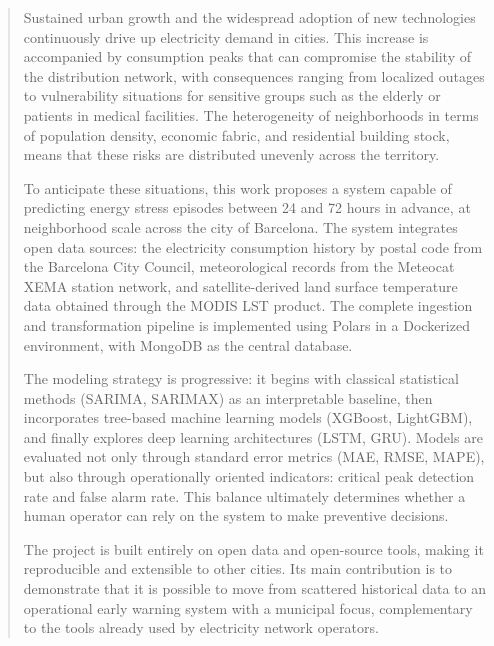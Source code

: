 \documentclass[12pt, a4paper]{article}
\begin{document}
\renewcommand{\abstractname}{Abstract}
\begin{abstract}
Sustained urban growth and the widespread adoption of new technologies continuously drive up electricity demand in cities. This increase is accompanied by consumption peaks that can compromise the stability of the distribution network, with consequences ranging from localized outages to vulnerability situations for sensitive groups such as the elderly or patients in medical facilities. The heterogeneity of neighborhoods in terms of population density, economic fabric, and residential building stock, means that these risks are distributed unevenly across the territory.

To anticipate these situations, this work proposes a system capable of predicting energy stress episodes between 24 and 72 hours in advance, at neighborhood scale across the city of Barcelona. The system integrates open data sources: the electricity consumption history by postal code from the Barcelona City Council, meteorological records from the Meteocat XEMA station network, and satellite-derived land surface temperature data obtained through the MODIS LST product. The complete ingestion and transformation pipeline is implemented using Polars in a Dockerized environment, with MongoDB as the central database.

The modeling strategy is progressive: it begins with classical statistical methods (SARIMA, SARIMAX) as an interpretable baseline, then incorporates tree-based machine learning models (XGBoost, LightGBM), and finally explores deep learning architectures (LSTM, GRU). Models are evaluated not only through standard error metrics (MAE, RMSE, MAPE), but also through operationally oriented indicators: critical peak detection rate and false alarm rate. This balance ultimately determines whether a human operator can rely on the system to make preventive decisions.

The project is built entirely on open data and open-source tools, making it reproducible and extensible to other cities. Its main contribution is to demonstrate that it is possible to move from scattered historical data to an operational early warning system with a municipal focus, complementary to the tools already used by electricity network operators.
\end{abstract}

\newpage
\tableofcontents
\newpage

\end{document}
